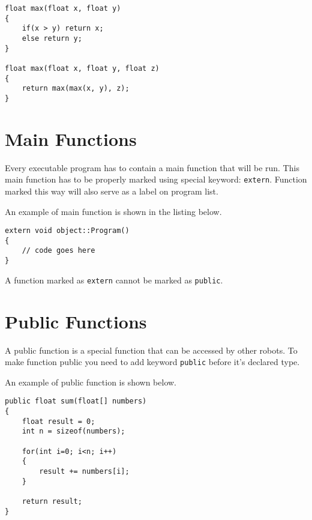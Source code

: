 \begin{lstlisting}
float max(float x, float y)
{
    if(x > y) return x;
    else return y;
}

float max(float x, float y, float z)
{
    return max(max(x, y), z);
}
\end{lstlisting}


\section{Main Functions}
Every executable program has to contain a main function that will be run. This main function has to be properly marked using special keyword: \texttt{extern}. Function marked this way will also serve as a label on program list.

An example of main function is shown in the listing below.

\begin{lstlisting}
extern void object::Program()
{
    // code goes here
}
\end{lstlisting}

A function marked as \texttt{extern} cannot be marked as \texttt{public}.


\section{Public Functions}
A public function is a special function that can be accessed by other robots. To make function public you need to add keyword \texttt{public} before it's declared type.

An example of public function is shown below.

\begin{lstlisting}
public float sum(float[] numbers)
{
    float result = 0;
    int n = sizeof(numbers);
    
    for(int i=0; i<n; i++)
    {
        result += numbers[i];
    }
    
    return result;
}
\end{lstlisting}
